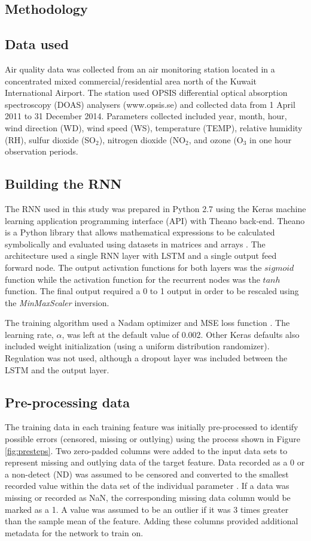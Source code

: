 \documentclass[preprint,12pt,authoryear]{elsarticle}
\begin{document}
\begin{linenumbers}
\section{Methodology}
\subsection{Data used}
 
Air quality data was collected from an air monitoring station located in a concentrated mixed commercial/residential area  north of the Kuwait International  Airport. The station used OPSIS differential optical absorption spectroscopy (DOAS) analysers (www.opsis.se)  and collected data from 1 April 2011 to 31 December 2014. Parameters collected included year, month, hour, wind direction (WD), wind speed (WS), temperature (TEMP), relative humidity (RH), sulfur dioxide (SO$_{2}$), nitrogen dioxide (NO$_{2}$, and ozone (O$_{3}$ in one hour observation periods.   

\subsection{Building the RNN}
The RNN used in this study was prepared in Python 2.7 using the Keras machine learning application programming interface (API) \citep{keras2015} with Theano back-end. Theano is a Python library that allows mathematical expressions to be calculated symbolically and evaluated using datasets in matrices and arrays \citep{Al-Rfou2016}. The architecture used a single RNN layer with LSTM and a single output feed forward node. The output activation functions for both layers was the $sigmoid$ function while the activation function for the recurrent nodes was the $tanh$ function. The final output required a 0 to 1 output in order to be rescaled using the \emph{MinMaxScaler} inversion.

The training algorithm used a Nadam optimizer and MSE loss function \citep{Freeman2018a}. The learning rate, $\alpha$, was left at the default value of 0.002. Other Keras defaults also included weight initialization (using a uniform distribution randomizer). Regulation was not used, although a dropout layer was included between the LSTM and the output layer. 

\subsection{Pre-processing data}
The training data in each training feature was initially pre-processed to identify possible errors (censored, missing or outlying) using the process shown in Figure \ref{fig:presteps}.  Two zero-padded columns were added to the input data sets to represent missing and outlying data of the target feature. Data recorded as a 0 or a non-detect (ND) was assumed to be censored and converted to the smallest recorded value within the data set of the individual parameter \citep{Rana2015, Helsel2011}.  If a data was missing or recorded as NaN, the corresponding missing data column would be marked as a 1. A value was assumed to be an outlier if it was 3 times greater than the sample mean of the feature. Adding these columns provided additional metadata for the network to train on.


\end{linenumbers}
\end{document}

